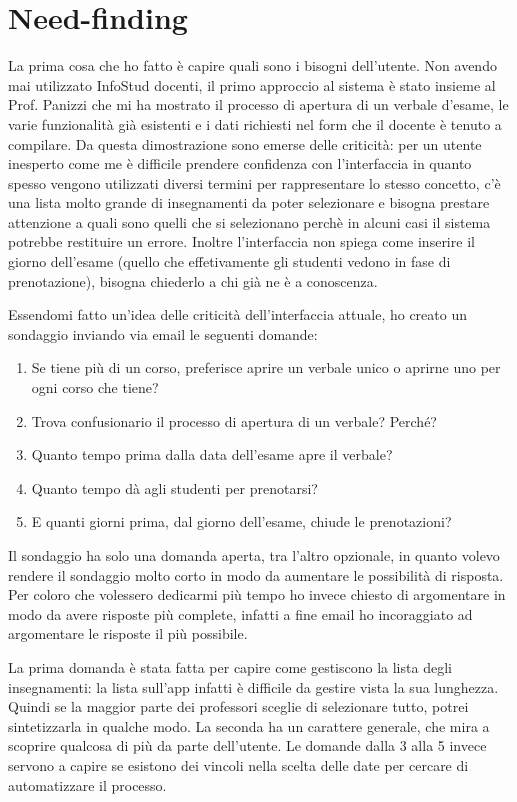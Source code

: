 \documentclass[Lau, oneside]{sapthesis}%
\begin{document}
\section{Need-finding}
\label{sec:nf}
La prima cosa che ho fatto è capire quali sono i bisogni dell'utente. Non avendo mai utilizzato InfoStud docenti, il primo approccio al sistema è stato insieme al Prof. Panizzi che mi ha mostrato il processo di apertura di un verbale d'esame, le varie funzionalità già esistenti e i dati richiesti nel form che il docente è tenuto a compilare. Da questa dimostrazione sono emerse delle criticità: per un utente inesperto come me è difficile prendere confidenza con l'interfaccia in quanto spesso vengono utilizzati diversi termini per rappresentare lo stesso concetto, c'è una lista molto grande di insegnamenti da poter selezionare e bisogna prestare attenzione a quali sono quelli che si selezionano perchè in alcuni casi il sistema potrebbe restituire un errore. Inoltre l'interfaccia non spiega come inserire il giorno dell'esame (quello che effetivamente gli studenti vedono in fase di prenotazione), bisogna chiederlo a chi già ne è a conoscenza.

Essendomi fatto un'idea delle criticità dell'interfaccia attuale, ho creato un sondaggio inviando via email le seguenti domande:

\begin{enumerate}
	\item Se tiene più di un corso, preferisce aprire un verbale unico o aprirne uno per ogni corso che tiene? 
	\item Trova confusionario il processo di apertura di un verbale? Perché?
	\item Quanto tempo prima dalla data dell’esame apre il verbale?
	\item Quanto tempo dà agli studenti per prenotarsi?
	\item E quanti giorni prima, dal giorno dell’esame, chiude le prenotazioni? 
\end{enumerate}

Il sondaggio ha solo una domanda aperta, tra l'altro opzionale, in quanto volevo rendere il sondaggio molto corto in modo da aumentare 
le possibilità di risposta. Per coloro che volessero dedicarmi più tempo ho invece chiesto di argomentare in modo da avere risposte
più complete, infatti a fine email ho incoraggiato ad argomentare le risposte il più possibile.

La prima domanda è stata fatta per capire come gestiscono la lista degli insegnamenti: la lista sull'app infatti è difficile da gestire
vista la sua lunghezza. Quindi se la maggior parte dei professori sceglie di selezionare tutto, potrei sintetizzarla in qualche modo.
La seconda ha un carattere generale, che mira a scoprire qualcosa di più da parte dell'utente.
Le domande dalla 3 alla 5 invece servono a capire se esistono dei vincoli nella scelta delle date per cercare di automatizzare il processo.
\end{document}
